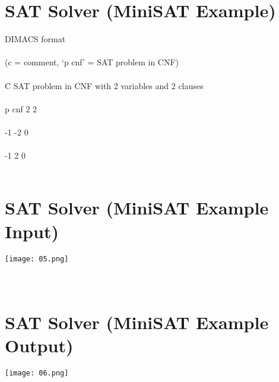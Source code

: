 \documentclass{article}
\begin{document}
\section{SAT Solver (MiniSAT Example)}
DIMACS 	format
\\ \\
(c = comment, ‘p cnf’ = SAT problem in CNF)
\\ \\
C SAT problem in CNF with 2 variables and 2 clauses
\\ \\
p cnf 2 2
\\ \\
-1 -2 0
\\ \\
-1 2 0
\\ \\
\section{SAT Solver (MiniSAT Example Input)}
\texttt{[image: 05.png]} \\
\\ \\
\section{SAT Solver (MiniSAT Example Output)}
\texttt{[image: 06.png]}\\
\\
\end{document}

